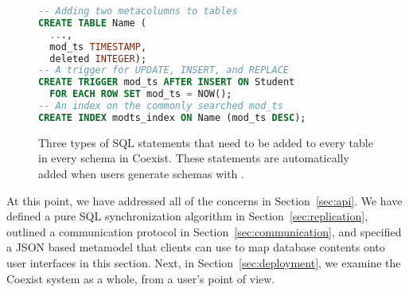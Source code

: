 \begin{figure}[h!]
\begin{lstlisting}[language=SQL]
-- Adding two metacolumns to tables
CREATE TABLE Name (
  ...,
  mod_ts TIMESTAMP,
  deleted INTEGER);
-- A trigger for UPDATE, INSERT, and REPLACE
CREATE TRIGGER mod_ts AFTER INSERT ON Student
  FOR EACH ROW SET mod_ts = NOW();
-- An index on the commonly searched mod_ts
CREATE INDEX modts_index ON Name (mod_ts DESC);

\end{lstlisting}
\caption{Three types of SQL statements that need to be added to every table in
every schema in Coexist. These statements are automatically added when  users
generate schemas with .}
\label{fig:modelgen_save}
\end{figure}


At this point, we have addressed all of the concerns in Section~\ref{sec:api}.
We have defined a pure SQL synchronization algorithm in
Section~\ref{sec:replication}, outlined a communication protocol in
Section~\ref{sec:communication}, and specified a JSON based metamodel that
clients can use to map database contents onto user interfaces in this section.
Next, in Section~\ref{sec:deployment}, we examine the Coexist system as a whole,
from a user's point of view.




